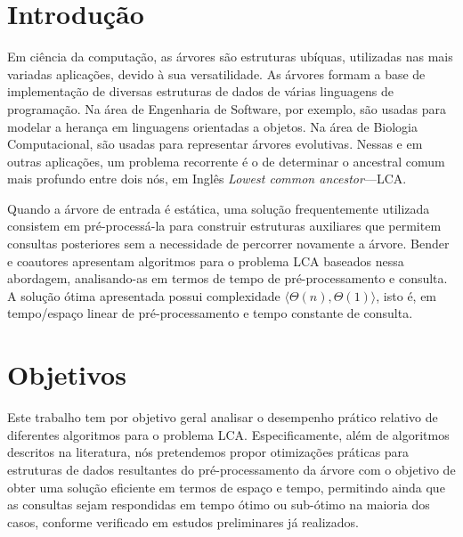\documentclass[12pt, a4paper, oneside]{article}
\begin{document}
\section*{Introdução}

Em ciência da computação, as árvores são estruturas ubíquas, utilizadas nas mais variadas aplicações, devido à sua versatilidade. As árvores formam a base de implementação de diversas estruturas de dados de várias linguagens de programação. Na área de Engenharia de Software, por exemplo, são usadas para modelar a herança em linguagens orientadas a objetos. Na área de Biologia Computacional, são usadas para representar árvores evolutivas. Nessas e em outras aplicações, um problema recorrente é o de determinar o ancestral comum mais profundo entre dois nós, em Inglês \textit{Lowest common ancestor}---LCA. 

Quando a árvore de entrada é estática, uma solução frequentemente utilizada consistem em pré-processá-la para construir estruturas auxiliares que permitem consultas posteriores sem a necessidade de percorrer novamente a árvore. Bender e coautores \cite{Bender2005} apresentam algoritmos para o problema LCA baseados nessa abordagem, analisando-as em termos de tempo de pré-processamento e consulta. A solução ótima apresentada possui complexidade $\langle \Theta(n), \Theta(1)\rangle$, isto é, em tempo/espaço linear de pré-processamento e tempo constante de consulta.


\section*{Objetivos}


Este trabalho tem por objetivo geral analisar o desempenho prático relativo de diferentes algoritmos para o problema LCA. Especificamente, além de algoritmos descritos na literatura, nós pretendemos propor otimizações práticas para estruturas de dados resultantes do  pré-processamento da árvore com o objetivo de obter uma solução eficiente em termos de espaço e tempo, permitindo ainda que as consultas sejam respondidas em tempo ótimo ou sub-ótimo na maioria dos casos, conforme verificado em estudos preliminares já realizados.
\end{document}
